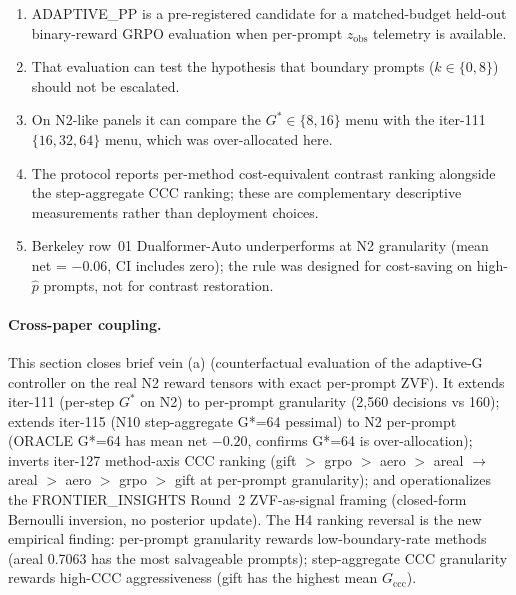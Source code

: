 \begin{enumerate}
\item ADAPTIVE\_PP is a pre-registered candidate for a matched-budget
      held-out binary-reward GRPO evaluation when per-prompt
      $z_{\mathrm{obs}}$ telemetry is available.
\item That evaluation can test the hypothesis that boundary prompts
      ($k \in \{0,8\}$) should not be escalated.
\item On N2-like panels it can compare the $G^* \in \{8,16\}$ menu with
      the iter-111 $\{16,32,64\}$ menu, which was over-allocated here.
\item The protocol reports per-method cost-equivalent contrast ranking
      alongside the step-aggregate CCC ranking; these are complementary
      descriptive measurements rather than deployment choices.
\item Berkeley row~01 Dualformer-Auto underperforms at N2 granularity
      (mean net = $-0.06$, CI includes zero); the rule was designed for
      cost-saving on high-$\hat{p}$ prompts, not for contrast restoration.
\end{enumerate}

\paragraph{Cross-paper coupling.}

This section closes brief vein (a) (counterfactual evaluation of the
adaptive-G controller on the real N2 reward tensors with exact per-prompt
ZVF). It extends iter-111 (per-step $G^*$ on N2) to per-prompt granularity
(2,560 decisions vs 160); extends iter-115 (N10 step-aggregate G*=64
pessimal) to N2 per-prompt (ORACLE G*=64 has mean net $-0.20$, confirms
G*=64 is over-allocation); inverts iter-127 method-axis CCC ranking
(gift $>$ grpo $>$ aero $>$ areal $\to$ areal $>$ aero $>$ grpo $>$ gift at
per-prompt granularity); and operationalizes the FRONTIER\_INSIGHTS Round~2
ZVF-as-signal framing (closed-form Bernoulli inversion, no posterior
update). The H4 ranking reversal is the new empirical finding: per-prompt
granularity rewards low-boundary-rate methods (areal 0.7063 has the most
salvageable prompts); step-aggregate CCC granularity rewards high-CCC
aggressiveness (gift has the highest mean $G_{\mathrm{ccc}}$).
